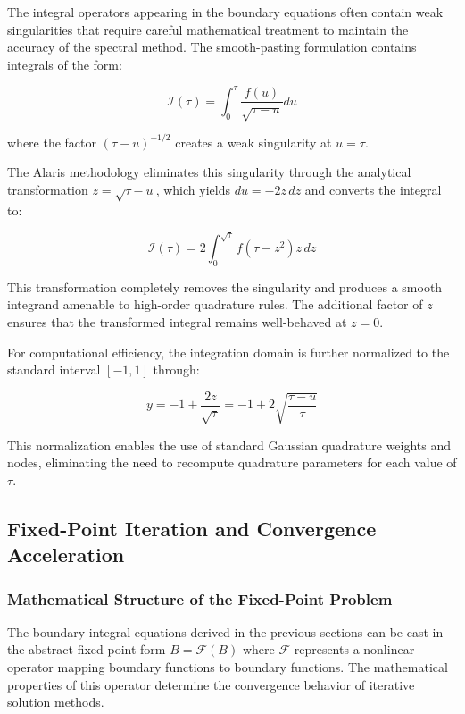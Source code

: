 \documentclass[
  11pt,
  11pt,
  letterpaper,
  onecolumn]{article}
\begin{document}
The integral operators appearing in the boundary equations often contain
weak singularities that require careful mathematical treatment to
maintain the accuracy of the spectral method. The smooth-pasting
formulation contains integrals of the form:

\[\mathcal{I}(\tau) = \int_0^\tau \frac{f(u)}{\sqrt{\tau-u}} du \tag{5.12}\]

where the factor \((\tau-u)^{-1/2}\) creates a weak singularity at
\(u = \tau\).

The Alaris methodology eliminates this singularity through the
analytical transformation \(z = \sqrt{\tau-u}\), which yields
\(du = -2z \, dz\) and converts the integral to:

\[\mathcal{I}(\tau) = 2\int_0^{\sqrt{\tau}} f(\tau-z^2) z \, dz \tag{5.13}\]

This transformation completely removes the singularity and produces a
smooth integrand amenable to high-order quadrature rules. The additional
factor of \(z\) ensures that the transformed integral remains
well-behaved at \(z = 0\).

For computational efficiency, the integration domain is further
normalized to the standard interval \([-1,1]\) through:

\[y = -1 + \frac{2z}{\sqrt{\tau}} = -1 + 2\sqrt{\frac{\tau-u}{\tau}} \tag{5.14}\]

This normalization enables the use of standard Gaussian quadrature
weights and nodes, eliminating the need to recompute quadrature
parameters for each value of \(\tau\).

\subsection{Fixed-Point Iteration and Convergence
Acceleration}\label{fixed-point-iteration-and-convergence-acceleration}

\subsubsection{Mathematical Structure of the Fixed-Point
Problem}\label{mathematical-structure-of-the-fixed-point-problem}

The boundary integral equations derived in the previous sections can be
cast in the abstract fixed-point form \(B = \mathcal{F}(B)\) where
\(\mathcal{F}\) represents a nonlinear operator mapping boundary
functions to boundary functions. The mathematical properties of this
operator determine the convergence behavior of iterative solution
methods.
\end{document}
